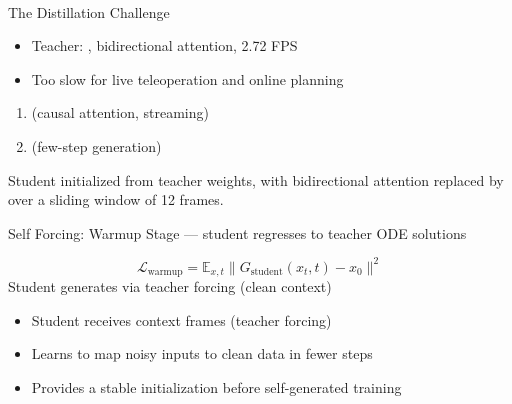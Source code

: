 \begin{frame}[plain]
\begin{center}
\vfill
{\Huge{}}\\[1em]
{\large{}}
\vfill
\end{center}
\end{frame}

\begin{frame}{The Distillation Challenge}
\begin{itemize}
    \item Teacher: ,
          bidirectional attention, 2.72 FPS
    \item Too slow for live teleoperation
          and online planning
\end{itemize}

\vspace{0.5em}
\begin{highlightbox}
\begin{enumerate}
    \item {}
          (causal attention, streaming)
    \item {}
          (few-step generation)
\end{enumerate}
\end{highlightbox}

\vspace{0.3em}
Student initialized from teacher weights,
with bidirectional attention replaced by
 over a sliding window of 12 frames.
\end{frame}

\begin{frame}{Self Forcing: Warmup Stage}
 --- student regresses to teacher ODE solutions

\vspace{0.5em}
\begin{eqbox}
\begin{equation*}
\mathcal{L}_{\text{warmup}}
  = \mathbb{E}_{x,t}\|G_{\text{student}}(x_{t},t)-x_{0}\|^2
\end{equation*}
{\small Student generates via teacher forcing (clean context)}
\end{eqbox}

\vspace{0.5em}
\begin{itemize}
    \item Student receives  context frames
          (teacher forcing)
    \item Learns to map noisy inputs to clean data
          in fewer steps
    \item Provides a stable initialization
          before self-generated training
\end{itemize}
\end{frame}

